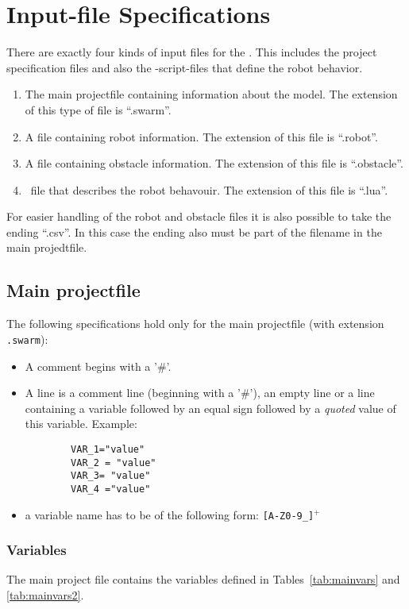 \label{cp:inputfile}
\section{Input-file Specifications}

There are exactly four kinds of input files for the \RSS. This includes the project specification files and also the \Lua-script-files that define the robot behavior.
\begin{enumerate}
	\item The main projectfile containing information about the model. The extension of this type of file is ``.swarm''.
	\item A file containing robot information. The extension of this file is ``.robot''.
	\item A file containing obstacle information. The extension of this file is ``.obstacle''.
	\item \Lua\ file that describes the robot behavouir. The extension of this file is ``.lua''.
\end{enumerate}
For easier handling of the robot and obstacle files it is also possible to take the ending ``.csv''. In this case the ending also must be part of the filename in the main projedtfile.

\subsection{Main projectfile}
The following specifications hold only for the main projectfile (with extension \texttt{.swarm}):
\begin{itemize}
	\item A comment begins with a '\#'.
	\item A line is a comment line (beginning with a '\#'), an empty line or a line containing a variable followed by an equal sign followed by a \emph{quoted} value of this variable. Example:
	\begin{verbatim}
		VAR_1="value"
		VAR_2 = "value"
		VAR_3= "value"
		VAR_4 ="value"
	\end{verbatim}
	\item a variable name has to be of the following form: \texttt{[A-Z0-9\_]$^+$}
\end{itemize}


\subsubsection{Variables}
The main project file contains the variables defined in Tables~\ref{tab:mainvars} and \ref{tab:mainvars2}.
	
